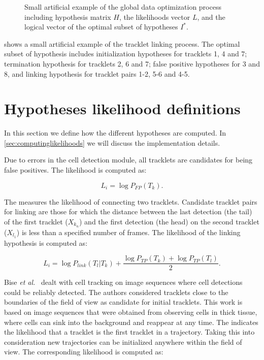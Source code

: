 \begin{figure}
\begin{subfigure}{.6\textwidth}
 			\end{subfigure}%
 			\caption{Small artificial example of the global data optimization process including hypothesis matrix $H$, the likelihoods vector $L$, and the logical vector of the optimal subset of hypotheses $I^*$.}
 			\label{fig:tracking_linprog}
 		\end{figure}
 		
 		 shows a small artificial example of the tracklet linking process. The optimal subset of hypothesis includes initialization hypotheses for tracklets 1, 4 and 7; termination hypothesis for tracklets 2, 6 and 7; false positive hypotheses for 3 and 8, and linking hypothesis for tracklet pairs 1-2, 5-6 and 4-5.
	 	
	 	
	 	        		
	\section{Hypotheses likelihood definitions}
		\label{sec:hypothesisdefinition}
		In this section we define how the different hypotheses are computed. In \cref{sec:computinglikelihoods} we will discuss the implementation details.
		
		Due to errors in the cell detection module, all tracklets are candidates for being false positives. The  likelihood is computed as:
		
		\[
			L_i = \log P_{FP}(T_k)\text{.}
		\]
		
		The  measures the likelihood of connecting two tracklets. Candidate tracklet pairs for linking are those for which the distance between the last detection (the tail) of the first tracklet ($X_{k_n}$)  and the first detection (the head) on the second tracklet ($X_{l_1}$) is less than a specified number of frames. The likelihood of the linking hypothesis is computed as:
		
		\[
			L_i = \log P_{link}(T_l | T_k) + \frac{\log P_{TP}(T_k) + \log P_{TP}(T_l)}{2} \text{.}
		\]
		
		Bise \emph{et al.}~\cite{bise11global} dealt with cell tracking on image sequences where cell detections could be reliably detected. The authors considered tracklets close to the boundaries of the field of view as candidate for initial tracklets. This work is based on image sequences that were obtained from observing cells in thick tissue, where cells can sink into the background and reappear at any time. The  indicates the likelihood that a tracklet is the first tracklet in a trajectory. Taking this into consideration new trajectories can be initialized anywhere within the field of view. The corresponding likelihood is computed as:
		
